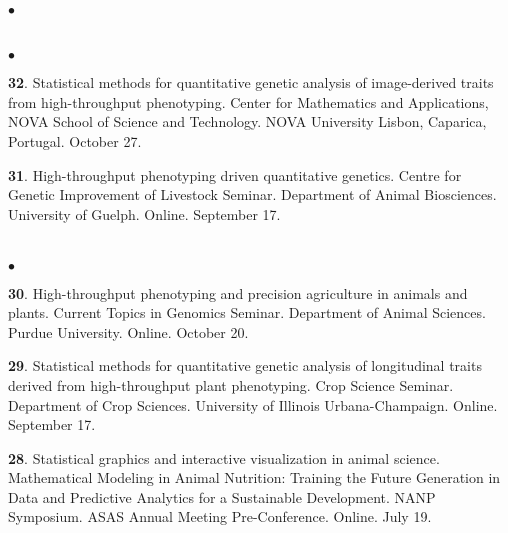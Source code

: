 \documentclass[margin,line,10pt]{res}
\newenvironment{list2}{
  \begin{list}{$\bullet$}{%
      \setlength{\itemsep}{0in}
      \setlength{\parsep}{0in} \setlength{\parskip}{0in}
      \setlength{\topsep}{0in} \setlength{\partopsep}{0in} 
      \setlength{\leftmargin}{0.2in}}}{\end{list}}
\begin{document}
\begin{resume}
\begin{list2}
  
\end{list2}



\section{}
\begin{list2}

\item [{\bf 32}.] Statistical methods for quantitative genetic analysis of image-derived traits from high-throughput phenotyping. Center for Mathematics and Applications, NOVA School of Science and Technology. NOVA University Lisbon, Caparica, Portugal. October 27.

      \vspace{0.5cm}
  
 \item [{\bf 31}.] High-throughput phenotyping driven quantitative genetics. Centre for Genetic Improvement of Livestock Seminar. Department of Animal Biosciences. University of Guelph. Online. September 17.

\end{list2}

\section{}
\begin{list2}

  \item [{\bf 30}.] High-throughput phenotyping and precision agriculture in animals and plants. Current Topics in Genomics Seminar. Department of Animal Sciences. Purdue University. Online. October 20.

     \vspace{0.5cm}

 \item [{\bf 29}.] Statistical methods for quantitative genetic analysis of longitudinal traits derived from high-throughput plant phenotyping. Crop Science Seminar. Department of Crop Sciences. University of Illinois Urbana-Champaign. Online. September 17. 

     \vspace{0.5cm}

 \item [{\bf 28}.] Statistical graphics and interactive visualization in animal science. Mathematical Modeling in Animal Nutrition: Training the Future Generation in Data and Predictive Analytics for a Sustainable Development. NANP Symposium. ASAS Annual Meeting Pre-Conference. Online. July 19. 



\end{list2}
\end{resume}
\end{document}
